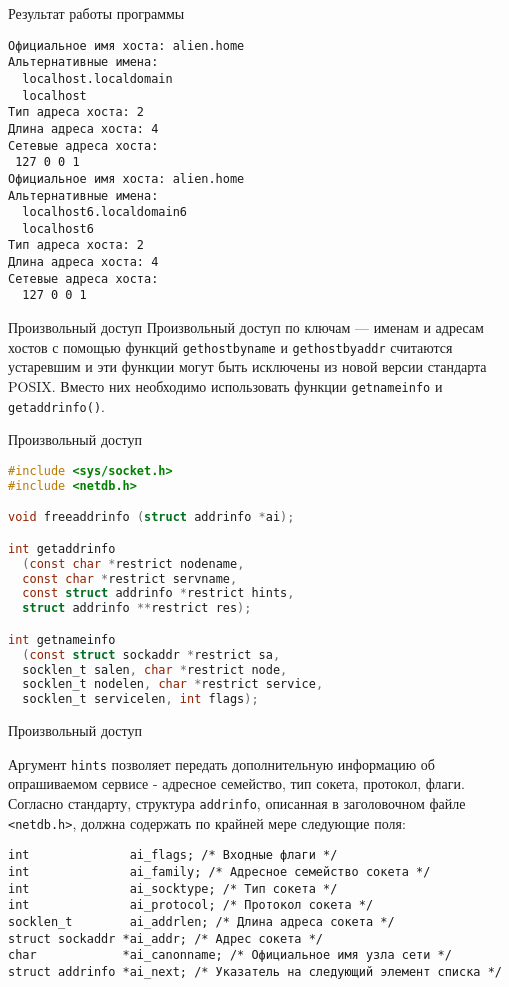 \begin{frame}[fragile]{Результат работы программы}
\scriptsize
\begin{verbatim}
Официальное имя хоста: alien.home
Альтернативные имена:
  localhost.localdomain
  localhost
Тип адреса хоста: 2
Длина адреса хоста: 4
Сетевые адреса хоста:
 127 0 0 1
Официальное имя хоста: alien.home
Альтернативные имена:
  localhost6.localdomain6
  localhost6
Тип адреса хоста: 2
Длина адреса хоста: 4
Сетевые адреса хоста:
  127 0 0 1
\end{verbatim}
\normalsize
\end{frame}

\begin{frame}{Произвольный доступ}
Произвольный доступ по ключам --- именам и адресам хостов с помощью функций {\tt gethostbyname} и {\tt gethostbyaddr} считаются устаревшим и эти функции могут быть исключены из новой версии стандарта POSIX. Вместо них необходимо использовать функции {\tt getnameinfo} и {\tt getaddrinfo()}.
\end{frame}

\begin{frame}[fragile]{Произвольный доступ}
\scriptsize\begin{lstlisting}[language=C]
#include <sys/socket.h>
#include <netdb.h>

void freeaddrinfo (struct addrinfo *ai);

int getaddrinfo 
  (const char *restrict nodename, 
  const char *restrict servname,
  const struct addrinfo *restrict hints,
  struct addrinfo **restrict res);

int getnameinfo 
  (const struct sockaddr *restrict sa, 
  socklen_t salen, char *restrict node, 
  socklen_t nodelen, char *restrict service,
  socklen_t servicelen, int flags);
\end{lstlisting}
\end{frame}

\begin{frame}[fragile]{Произвольный доступ}

Аргумент {\tt hints} позволяет передать дополнительную информацию об опрашиваемом сервисе - адресное семейство, тип сокета, протокол, флаги. 
Согласно стандарту, структура {\tt addrinfo}, описанная в заголовочном файле {\tt <netdb.h>}, должна содержать по крайней мере следующие поля: 

\scriptsize\begin{verbatim}
int              ai_flags; /* Входные флаги */
int              ai_family; /* Адресное семейство сокета */
int              ai_socktype; /* Тип сокета */
int              ai_protocol; /* Протокол сокета */
socklen_t        ai_addrlen; /* Длина адреса сокета */
struct sockaddr *ai_addr; /* Адрес сокета */
char            *ai_canonname; /* Официальное имя узла сети */
struct addrinfo *ai_next; /* Указатель на следующий элемент списка */
\end{verbatim}
\end{frame}

